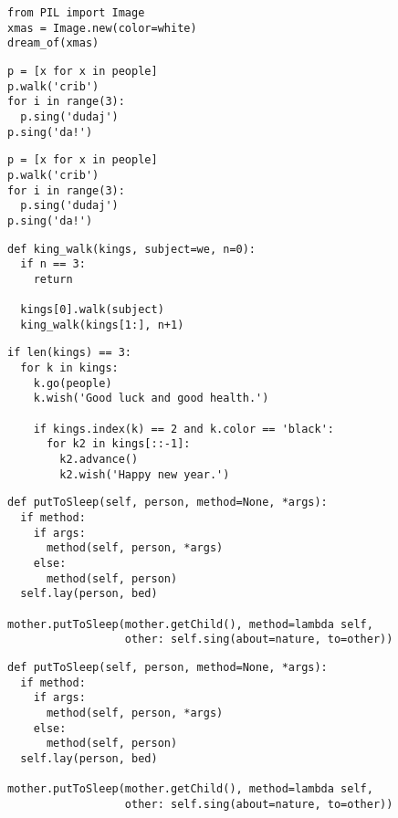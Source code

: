 \documentclass[12pt,a4paper]{article}
\begin{document}
\begin{lstlisting}
from PIL import Image
xmas = Image.new(color=white)
dream_of(xmas)
\end{lstlisting}


\begin{lstlisting}
p = [x for x in people]
p.walk('crib')
for i in range(3):
  p.sing('dudaj')
p.sing('da!')
\end{lstlisting}

\begin{lstlisting}
p = [x for x in people]
p.walk('crib')
for i in range(3):
  p.sing('dudaj')
p.sing('da!')
\end{lstlisting}


\begin{lstlisting}
def king_walk(kings, subject=we, n=0):
  if n == 3:
    return

  kings[0].walk(subject)
  king_walk(kings[1:], n+1)
\end{lstlisting}

\begin{lstlisting}
if len(kings) == 3:
  for k in kings:
    k.go(people)
    k.wish('Good luck and good health.')

    if kings.index(k) == 2 and k.color == 'black':
      for k2 in kings[::-1]:
        k2.advance()
        k2.wish('Happy new year.')
\end{lstlisting}



\begin{lstlisting}
def putToSleep(self, person, method=None, *args):
  if method:
    if args:
      method(self, person, *args)
    else:
      method(self, person)
  self.lay(person, bed)

mother.putToSleep(mother.getChild(), method=lambda self,
                  other: self.sing(about=nature, to=other))
\end{lstlisting}

\begin{lstlisting}
def putToSleep(self, person, method=None, *args):
  if method:
    if args:
      method(self, person, *args)
    else:
      method(self, person)
  self.lay(person, bed)

mother.putToSleep(mother.getChild(), method=lambda self,
                  other: self.sing(about=nature, to=other))
\end{lstlisting}
\end{document}
